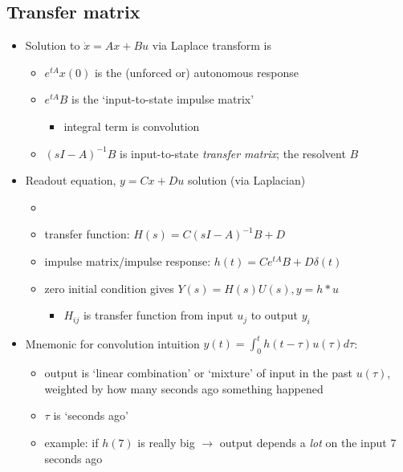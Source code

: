\documentclass[10pt,letterpaper]{article}
\begin{document}
\subsection{Transfer matrix}
\label{sec-12_5}

\begin{itemize}
\item Solution to $\dot x=Ax+Bu$ via Laplace transform is 

\begin{itemize}
\item $e ^{tA} x(0)$ is the (unforced or) autonomous response
\item $e ^{tA} B$ is the `input-to-state impulse matrix'

\begin{itemize}
\item integral term is convolution
\end{itemize}

\item $(sI-A) ^{-1} B$ is input-to-state \emph{transfer matrix}; the resolvent \texttimes{} $B$
\end{itemize}

\item Readout equation, $y=Cx+Du$ solution (via Laplacian)

\begin{itemize}
\item {}
\item transfer function: $H(s)= C(sI-A) ^{-1} B+D$
\item impulse matrix/impulse response: $h(t)= C e ^{tA} B + D \delta(t)$
\item zero initial condition gives $Y(s)= H(s)U(s), y=h*u$

\begin{itemize}
\item $H _{ij}$ is transfer function from input $u _{j}$ to output $y _{i}$
\end{itemize}

\end{itemize}

\item Mnemonic for convolution intuition $\displaystyle y(t) = \int^{t}_{0} h(t-\tau) u(\tau) d\tau$:

\begin{itemize}
\item output is `linear combination' or `mixture' of input in the past $u(\tau)$, weighted by how many seconds ago something happened
\item $\tau$ is `seconds ago'
\item example: if $h(7)$ is really big $\rightarrow$ output depends a \emph{lot} on the input 7 seconds ago


\end{itemize}
\end{itemize}
\end{document}
